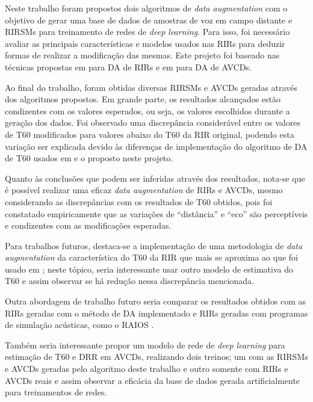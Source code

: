Neste trabalho foram propostos dois algoritmos de \textit{data augmentation} com o objetivo de gerar uma base de dados de amostras de voz 
em campo distante e RIRSMs para treinamento de redes de \textit{deep learning}.
Para isso, foi necessário avaliar as principais características e modelos usados nas RIRs para deduzir formas de realizar
a modificação das mesmas. Este projeto foi baseado nas técnicas propostas em \cite{RIR_Data_Aug} para DA de RIRs e em \cite{Speech_Rec}
para DA de AVCDs.

Ao final do trabalho, foram obtidas diversas RIRSMs e AVCDs geradas através dos algoritmos propostos. 
Em grande parte, os resultados alcançados estão condizentes com os valores esperados, ou seja, os valores
escolhidos durante a geração dos dados. Foi observado uma discrepância considerável entre os valores de T60 modificados 
para valores abaixo do T60 da RIR original, podendo esta variação ser explicada devido às diferenças de implementação 
do algoritmo de DA de T60 usados em \cite{RIR_Data_Aug} e o proposto neste projeto.

Quanto às conclusões que podem ser inferidas através dos resultados, nota-se que é possível realizar uma eficaz
\textit{data augmentation} de RIRs e AVCDs, mesmo considerando as discrepâncias com os resultados de T60 obtidos,
pois foi constatado empiricamente que as variações de “distância” e “eco” são perceptíveis e condizentes com as modificações
esperadas.

Para trabalhos futuros, destaca-se a implementação de uma metodologia de \textit{data augmentation} da característica do T60
da RIR que mais se aproxima ao que foi usado em \cite{RIR_Data_Aug}; neste tópico, seria interessante usar outro modelo
de estimativa do T60 e assim observar se há redução nessa discrepância mencionada.

Outra abordagem de trabalho futuro seria comparar os resultados obtidos com as RIRs geradas com o método de DA implementado e RIRs 
geradas com programas de simulação acústicas, como o RAIOS \cite{RAIOS}.

Também seria interessante propor um modelo de rede de \textit{deep learning} para estimação de T60 e DRR em AVCDs,
realizando dois treinos; um com as RIRSMs e AVCDs geradas pelo algoritmo deste trabalho e outro somente com RIRs e AVCDs reais e 
assim observar a eficácia da base de dados gerada artificialmente para treinamentos de redes.







